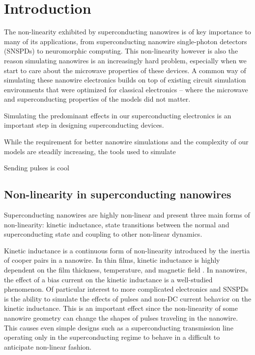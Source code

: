 \documentclass{article}
\begin{document}


\tableofcontents

\newpage


\section{Introduction}

The non-linearity exhibited by superconducting nanowires is of key importance to many of its applications,
from superconducting nanowire single-photon detectors (SNSPDs) to neuromorphic computing. This non-linearity
however is also the reason simulating nanowires is an increasingly hard problem, especially when we start
to care about the microwave properties of these devices. A common way of simulating these nanowire electronics
builds on top of existing circuit simulation environments that were optimized for classical electronics -- where
the microwave and superconducting properties of the models did not matter. 

Simulating the predominant effects in our superconducting electronics is an important step in designing
superconducting devices.

While the requirement for better nanowire simulations and the complexity of our models are steadily increasing,
the tools used to simulate

Sending pulses is cool


\subsection{Non-linearity in superconducting nanowires}

Superconducting nanowires are highly non-linear and present three main forms of non-linearity:
kinetic inductance, state transitions between the normal and superconducting state and
coupling to other non-linear dynamics.

Kinetic inductance is a continuous form of non-linearity introduced by the inertia of cooper
pairs in a nanowire. In thin films, kinetic inductance is highly dependent on the film thickness,
temperature, and magnetic field \cite{dizhu-thesis}. In nanowires, the effect of a bias current
on the kinetic inductance is a well-studied phenomenon. Of particular interest to more complicated
electronics and SNSPDs is the ability to simulate the effects of pulses and non-DC current behavior
on the kinetic inductance. This is an important effect since the non-linearity of some nanowire 
geometry can change the shapes of pulses traveling in the nanowire. This causes even simple designs 
such as a superconducting transmission line operating only in the superconducting regime to 
behave in a difficult to anticipate non-linear fashion. 
\end{document}
